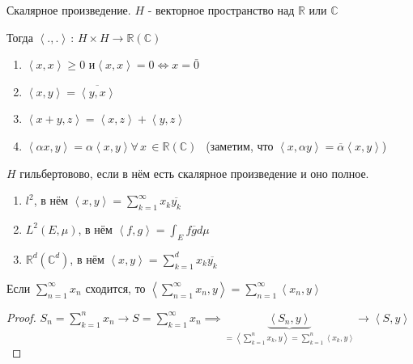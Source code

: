 
\begin{remark}
    Скалярное произведение. $H$ - векторное пространство над $\mathbb{R}$ или $\mathbb{C}$

    Тогда $\left < ., . \right > \, : \, H \times H \to \mathbb{R} (\mathbb{C})$

    \begin{enumerate}
        \item $\left <x, x \right > \geqslant 0$ и$\left <x, x \right > = 0 \Leftrightarrow x = \bar{0}$
        \item $\left <x, y \right > = \overline{\left <y, x \right >}$
        \item $\left <x + y, z \right > = \left <x, z \right > + \left <y, z \right >$
        \item $\left <\alpha x, y \right > = \alpha \left <x, y \right > \forall \, x \, \in \mathbb{R} (\mathbb{C}) \ \ $  (заметим, что $\left<x, \alpha y\right> = \overline{\alpha} \left<x, y\right>$)
    \end{enumerate}
\end{remark}

\begin{definition}
    $H$ гильбертовово, если в нём есть скалярное произведение и оно полное.
\end{definition}

\begin{example}
    \begin{enumerate}
        \item {
            $l^2$, в нём $\left<x, y\right> = \sum_{k = 1}^{\infty} x_k \overline{y_k}$
        }
        \item {
            $L^2 (E, \mu)$, в нём $\left < f, g \right > = \int_{E} f \overline{g} d\mu$
        }
        \item {
            $\mathbb{R}^d (\mathbb{C}^d)$, в нём $\left < x, y \right > = \sum_{k = 1}^d x_k \overline{y_k}$
        }
    \end{enumerate}
\end{example}

\begin{lemma}
    Если $\sum_{n = 1}^{\infty} x_n$ сходится, то $\left < \sum_{n = 1}^\infty x_n, y \right > = \sum_{n = 1}^{\infty} \left < x_n, y \right >$
\end{lemma}

\begin{proof}
    $S_n = \sum_{k = 1}^n x_n \rightarrow S = \sum_{k = 1}^{\infty} x_n \implies \underbrace{\left < S_n, y \right >}_{=\left < \sum_{k = 1}^n x_k, y \right > = \sum_{k=1}^{n} \left < x_k , y \right >} \rightarrow \left < S, y \right >$
\end{proof}


